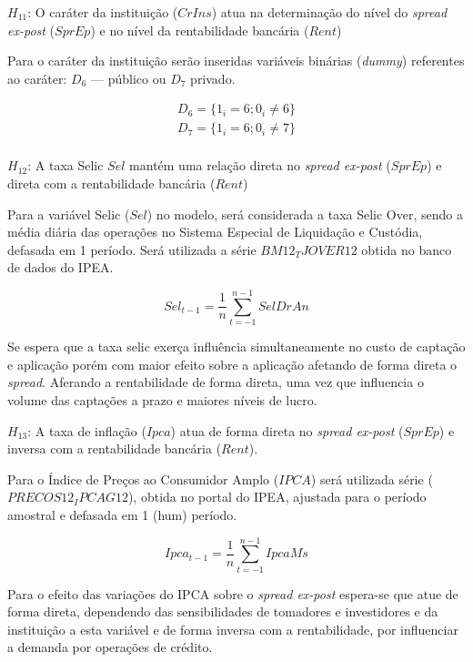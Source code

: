 \documentclass[
  12pt,
  12pt,
  openright,
  oneside,
  a4paper,
  chapter=TITLE,
  section=TITLE,
  subsection=TITLE,
  subsubsection=TITLE,
  english,
  portugues,
  sumario=tradicional]{abntex2}
\begin{document}
\(H_{11}\): O caráter da instituição (\(CrIns\)) atua na determinação do nível do
\emph{spread ex-post} (\(SprEp\)) e no nível da rentabilidade bancária (\(Rent\))

Para o caráter da instituição serão inseridas variáveis binárias (\emph{dummy}) referentes ao caráter: \(D_{6}\) --- público ou \(D_{7}\) privado.

\begin{equation}
\begin{aligned}
D_{6} = \lbrace 1_{i} = 6 ; 0_{i} \neq 6 \rbrace \\
D_{7} = \lbrace 1_{i} = 6 ; 0_{i} \neq 7 \rbrace \\
\end{aligned}
\end{equation}

\(H_{12}\): A taxa Selic \(Sel\) mantém uma relação direta no \emph{spread ex-post} (\(SprEp\)) e direta com a rentabilidade bancária (\(Rent\))

Para a variável Selic (\(Sel\)) no modelo, será considerada a taxa Selic Over, sendo a média diária das operações no Sistema Especial de Liquidação e Custódia, defasada em 1 período. Será utilizada a série \(BM12_TJOVER12\) obtida no banco de dados do IPEA.

\begin{equation}
Sel_{t-1} = \frac{1}{n}\sum_{t=-1}^{n-1}SelDrAn
\end{equation}

Se espera que a taxa selic exerça influência simultaneamente no custo de captação e aplicação porém com maior efeito sobre a aplicação afetando de forma direta o \emph{spread}. Aferando a rentabilidade de forma direta, uma vez que influencia o volume das captações a prazo e maiores níveis de lucro.

\(H_{13}\): A taxa de inflação (\(Ipca\)) atua de forma direta no \emph{spread ex-post} (\(SprEp\)) e inversa com a rentabilidade bancária (\(Rent\)).

Para o Índice de Preços ao Consumidor Amplo (\(IPCA\)) será utilizada série (\(PRECOS12_IPCAG12\)), obtida no portal do IPEA, ajustada para o período amostral e defasada em 1 (hum) período.

\begin{equation}
Ipca_{t-1} = \frac{1}{n}\sum_{t=-1}^{n-1}IpcaMs
\end{equation}

Para o efeito das variações do IPCA sobre o \emph{spread ex-post} espera-se que atue de forma direta, dependendo das sensibilidades de tomadores e investidores e da instituição a esta variável e de forma inversa com a rentabilidade, por influenciar a demanda por operações de crédito.
\end{document}

